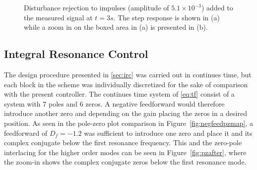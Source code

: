 \begin{figure}[h!]
  \centering %
  \qquad
  \caption{\label{fig:distmeasrejection} Disturbance rejection to impulses (amplitude of $5.1 \times 10^{-3}$) added to the measured signal at $t=3s$. The step response is shown in (a) while a zoom in on the boxed area in (a) is presented in (b).}
\end{figure}

\newpage
\subsection{Integral Resonance Control}
The \abbrIRC design procedure presented in \ref{sec:irc} was carried out in continues time, but each block in the scheme was individually discretized for the sake of comparison with the present controller. The continues time system of \eqref{eq:tf} consist of a system with 7 poles and 6 zeros. A negative feedforward would therefore introduce another zero and depending on the gain placing the zeros in a desired position. As seen in the pole-zero plot comparison in Figure~\ref{fig:negfeedpzmap}, a feedforward of $D_f=-1.2$ was sufficient to introduce one zero and place it and its complex conjugate below the first resonance frequency. This and the zero-pole interlacing for the higher order modes can be seen in Figure~\ref{fig:pzafter}, where the zoom-in shows the complex conjugate zeros below the first resonance mode.

